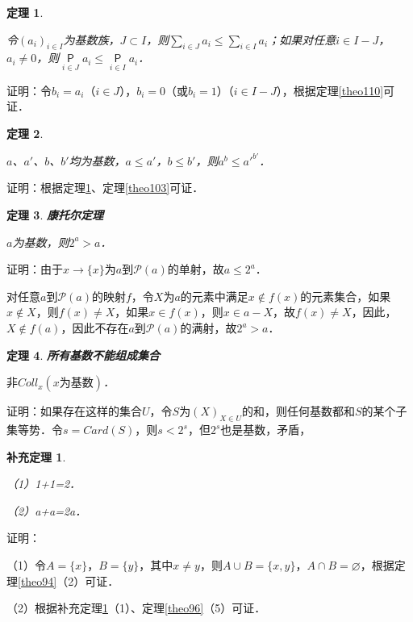 \documentclass[12pt, a4paper, oneside]{book}
\newtheorem{theo}{定理}
\newtheorem{cor}{补充定理}
\begin{document}
			\begin{theo}\label{theo111}
				\hfill\par
				令$(a_i)_{i\in I}$为基数族，$J\subset I$，则$\sum\limits_{i\in J}a_i\leq \sum\limits_{i\in I}a_i$；如果对任意$i\in I-J$，$a_i\neq 0$，则$\mathop{\mathsf{P}}\limits_{i\in J}a_i\leq \mathop{\mathsf{P}}\limits_{i\in I}a_i$．
			\end{theo}
			证明：令$b_i=a_i$（$i\in J$），$b_i=0$（或$b_i=1$）（$i\in I-J$），根据定理\ref{theo110}可证．
						
			\begin{theo}\label{theo112}
				\hfill\par
				$a$、$a'$、$b$、$b'$均为基数，$a\leq a'$，$b\leq b'$，则$a^b\leq {a'}^{b'}$．
			\end{theo}
			证明：根据定理\ref{theo111}、定理\ref{theo103}可证．
						
			\begin{theo}\label{theo113}
				\textbf{康托尔定理}
				\par
				$a$为基数，则$2^a>a$．
			\end{theo}
			证明：由于$x\to \{x\}$为$a$到$\mathcal{P}(a)$的单射，故$a\leq 2^a$．
			\par
			对任意$a$到$\mathcal{P}(a)$的映射$f$，令$X$为$a$的元素中满足$x\notin f(x)$的元素集合，如果$x\notin X$，则$f(x)\neq X$，如果$x\in f(x)$，则$x\in a-X$，故$f(x)\neq X$，因此，$X\notin f(a)$，因此不存在$a$到$\mathcal{P}(a)$的满射，故$2^a>a$．
						
			\begin{theo}\label{theo114}
				\textbf{所有基数不能组成集合}
				\par
				$\text{非}Coll_x(x\text{为基数})$．	
			\end{theo}
			证明：如果存在这样的集合$U$，令$S$为$(X)_{X\in U}$的和，则任何基数都和$S$的某个子集等势．令$s=Card(S)$，则$s<2^s$，但$2^s$也是基数，矛盾，
			
			\begin{cor}\label{cor299}
				\hfill\par
				（1）1+1=2．
				\par
				（2）a+a=2a．
			\end{cor}
			证明：
			\par
			（1）令$A=\{x\}$，$B=\{y\}$，其中$x\neq y$，则$A\cup B=\{x, y\}$，$A\cap B=\varnothing$，根据定理\ref{theo94}（2）可证．
			\par
			（2）根据补充定理\ref{cor299}（1）、定理\ref{theo96}（5）可证．
						
\end{document}
